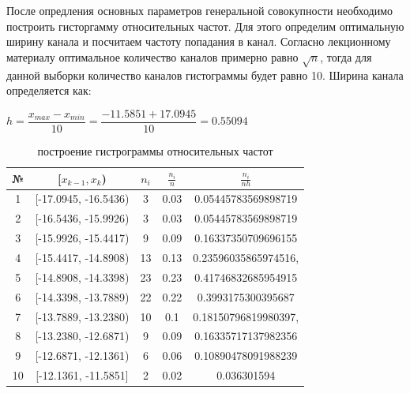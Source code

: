 \documentclass[a4paper, 12pt]{article}
\begin{document}
	\quad После опредления основных параметров генеральной совокупности необходимо построить гисторгамму относительных частот. Для этого определим оптимальную ширину канала и посчитаем частоту попадания в канал. Согласно лекционному материалу оптимальное количество каналов примерно равно $\sqrt{n}$, тогда для данной выборки количество каналов гистограммы будет равно 10. Ширина канала определяется как: 
	
	\begin{center}
		$ h = \dfrac{x_{max}-x_{min}}{10} = \dfrac{-11.5851 + 17.0945}{10} =  0.55094 $
	\end{center}
	
	\begin{table}[h!]
		\centering
		\begin{tabular}{|c|c|c|c|c|}
			\hline
			№ & [$x_{k-1}, x_k$) & $n_i$ & $ \frac{n_i}{n}$ & $\frac{n_i}{nh}$  \\
			\hline
			1 & [-17.0945, -16.5436) & 3 & 0.03  & 	0.05445783569898719 \\
			
			2 & [-16.5436, -15.9926) & 3 &  0.03 & 0.05445783569898719 \\
			
			3 & [-15.9926, -15.4417) & 9 & 0.09 & 0.16337350709696155 \\
			
			4 & [-15.4417, -14.8908) & 13 & 0.13 & 0.23596035865974516, \\
			
			5 & [-14.8908, -14.3398) & 23 & 0.23 &0.41746832685954915 \\
			
			6 & [-14.3398, -13.7889) & 22& 0.22 &0.3993175300395687 \\
			
			7 & [-13.7889, -13.2380) & 10 & 0.1 &0.18150796819980397, \\
			
			8 & [-13.2380, -12.6871) & 9 & 0.09 &0.16335717137982356 \\
			
			9 & [-12.6871, -12.1361) & 6& 0.06&0.10890478091988239 \\
			
			10 & [-12.1361, -11.5851] & 2 & 0.02 & 0.036301594 \\
			\hline
		\end{tabular}
		\caption{построение гистрограммы относительных частот}
	\end{table}
	
\end{document}
